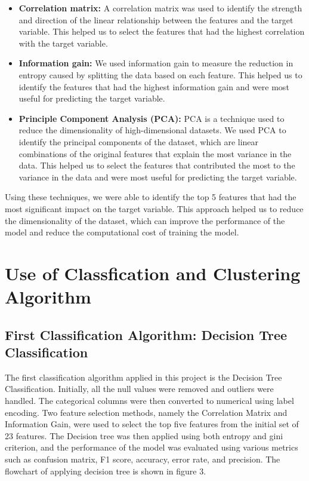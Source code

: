 \documentclass{article}
\begin{document}
\begin{itemize}
\item \textbf{Correlation matrix:} A correlation matrix was used to identify the strength and direction of the linear relationship between the features and the target variable. This helped us to select the features that had the highest correlation with the target variable.

\item \textbf{Information gain:} We used information gain to measure the reduction in entropy caused by splitting the data based on each feature. This helped us to identify the features that had the highest information gain and were most useful for predicting the target variable.

\item \textbf{Principle Component Analysis (PCA):} PCA is a technique used to reduce the dimensionality of high-dimensional datasets. We used PCA to identify the principal components of the dataset, which are linear combinations of the original features that explain the most variance in the data. This helped us to select the features that contributed the most to the variance in the data and were most useful for predicting the target variable.

\end{itemize}

Using these techniques, we were able to identify the top 5 features that had the most significant impact on the target variable. This approach helped us to reduce the dimensionality of the dataset, which can improve the performance of the model and reduce the computational cost of training the model.


\section{Use of Classfication and Clustering Algorithm}
\subsection{First Classification Algorithm: Decision Tree Classification}

The first classification algorithm applied in this project is the Decision Tree Classification. Initially, all the null values were removed and outliers were handled. The categorical columns were then converted to numerical using label encoding. Two feature selection methods, namely the Correlation Matrix and Information Gain, were used to select the top five features from the initial set of 23 features. The Decision tree was then applied using both entropy and gini criterion, and the performance of the model was evaluated using various metrics such as confusion matrix, F1 score, accuracy, error rate, and precision. The flowchart of applying decision tree is shown in figure 3.
\end{document}
